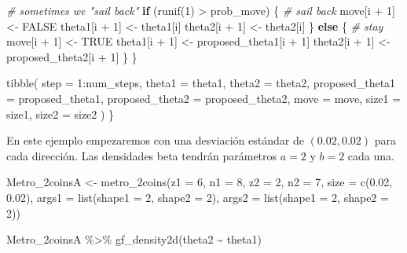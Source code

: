 \documentclass[
  12pt,
]{book}
\newenvironment{Shaded}{\begin{snugshade}}{\end{snugshade}}
\newcommand{\AttributeTok}[1]{\textcolor[rgb]{0.77,0.63,0.00}{#1}}
\newcommand{\CommentTok}[1]{\textcolor[rgb]{0.56,0.35,0.01}{\textit{#1}}}
\newcommand{\ConstantTok}[1]{\textcolor[rgb]{0.00,0.00,0.00}{#1}}
\newcommand{\ControlFlowTok}[1]{\textcolor[rgb]{0.13,0.29,0.53}{\textbf{#1}}}
\newcommand{\DecValTok}[1]{\textcolor[rgb]{0.00,0.00,0.81}{#1}}
\newcommand{\FloatTok}[1]{\textcolor[rgb]{0.00,0.00,0.81}{#1}}
\newcommand{\FunctionTok}[1]{\textcolor[rgb]{0.00,0.00,0.00}{#1}}
\newcommand{\NormalTok}[1]{#1}
\newcommand{\OtherTok}[1]{\textcolor[rgb]{0.56,0.35,0.01}{#1}}
\newcommand{\SpecialCharTok}[1]{\textcolor[rgb]{0.00,0.00,0.00}{#1}}
\theoremstyle{definition}
\theoremstyle{definition}
\theoremstyle{definition}
\theoremstyle{definition}
\theoremstyle{remark}
\begin{document}
\begin{Shaded}
\begin{Highlighting}[]
    \CommentTok{\# sometimes we "sail back"}
    \ControlFlowTok{if}\NormalTok{ (}\FunctionTok{runif}\NormalTok{(}\DecValTok{1}\NormalTok{) }\SpecialCharTok{\textgreater{}}\NormalTok{ prob\_move) \{ }\CommentTok{\# sail back}
\NormalTok{      move[i }\SpecialCharTok{+} \DecValTok{1}\NormalTok{] }\OtherTok{\textless{}{-}} \ConstantTok{FALSE}
\NormalTok{      theta1[i }\SpecialCharTok{+} \DecValTok{1}\NormalTok{] }\OtherTok{\textless{}{-}}\NormalTok{ theta1[i]}
\NormalTok{      theta2[i }\SpecialCharTok{+} \DecValTok{1}\NormalTok{] }\OtherTok{\textless{}{-}}\NormalTok{ theta2[i]}
\NormalTok{    \} }\ControlFlowTok{else}\NormalTok{ \{ }\CommentTok{\# stay}
\NormalTok{      move[i }\SpecialCharTok{+} \DecValTok{1}\NormalTok{] }\OtherTok{\textless{}{-}} \ConstantTok{TRUE}
\NormalTok{      theta1[i }\SpecialCharTok{+} \DecValTok{1}\NormalTok{] }\OtherTok{\textless{}{-}}\NormalTok{ proposed\_theta1[i }\SpecialCharTok{+} \DecValTok{1}\NormalTok{]}
\NormalTok{      theta2[i }\SpecialCharTok{+} \DecValTok{1}\NormalTok{] }\OtherTok{\textless{}{-}}\NormalTok{ proposed\_theta2[i }\SpecialCharTok{+} \DecValTok{1}\NormalTok{]}
\NormalTok{    \}}
\NormalTok{  \}}

  \FunctionTok{tibble}\NormalTok{(}
    \AttributeTok{step =} \DecValTok{1}\SpecialCharTok{:}\NormalTok{num\_steps,}
    \AttributeTok{theta1 =}\NormalTok{ theta1,}
    \AttributeTok{theta2 =}\NormalTok{ theta2,}
    \AttributeTok{proposed\_theta1 =}\NormalTok{ proposed\_theta1,}
    \AttributeTok{proposed\_theta2 =}\NormalTok{ proposed\_theta2,}
    \AttributeTok{move =}\NormalTok{ move,}
    \AttributeTok{size1 =}\NormalTok{ size1,}
    \AttributeTok{size2 =}\NormalTok{ size2}
\NormalTok{  )}
\NormalTok{\}}
\end{Highlighting}
\end{Shaded}

En este ejemplo empezaremos con una desviación estándar de \((0.02,0.02)\) para cada dirección. Las densidades beta tendrán parámetros \(a=2\) y \(b=2\) cada una.

\begin{Shaded}
\begin{Highlighting}[]
\NormalTok{Metro\_2coinsA }\OtherTok{\textless{}{-}} \FunctionTok{metro\_2coins}\NormalTok{(}\AttributeTok{z1 =} \DecValTok{6}\NormalTok{, }\AttributeTok{n1 =} \DecValTok{8}\NormalTok{, }\AttributeTok{z2 =} \DecValTok{2}\NormalTok{,}
    \AttributeTok{n2 =} \DecValTok{7}\NormalTok{, }\AttributeTok{size =} \FunctionTok{c}\NormalTok{(}\FloatTok{0.02}\NormalTok{, }\FloatTok{0.02}\NormalTok{), }\AttributeTok{args1 =} \FunctionTok{list}\NormalTok{(}\AttributeTok{shape1 =} \DecValTok{2}\NormalTok{,}
        \AttributeTok{shape2 =} \DecValTok{2}\NormalTok{), }\AttributeTok{args2 =} \FunctionTok{list}\NormalTok{(}\AttributeTok{shape1 =} \DecValTok{2}\NormalTok{, }\AttributeTok{shape2 =} \DecValTok{2}\NormalTok{))}

\NormalTok{Metro\_2coinsA }\SpecialCharTok{\%\textgreater{}\%}
    \FunctionTok{gf\_density2d}\NormalTok{(theta2 }\SpecialCharTok{\textasciitilde{}}\NormalTok{ theta1)}
\end{Highlighting}
\end{Shaded}
\end{document}
